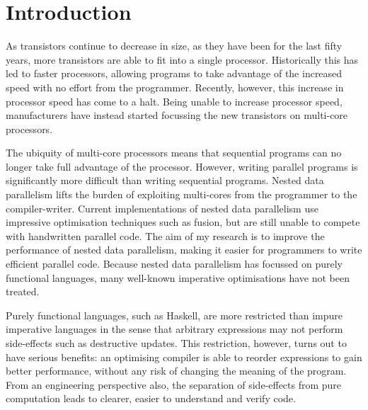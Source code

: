
\section{Introduction}
As transistors continue to decrease in size, as they have been for the last fifty years, more transistors are able to fit into a single processor.
Historically this has led to faster processors, allowing programs to take advantage of the increased speed with no effort from the programmer.
Recently, however, this increase in processor speed has come to a halt.
Being unable to increase processor speed, manufacturers have instead started focussing the new transistors on multi-core processors.

The ubiquity of multi-core processors means that sequential programs can no longer take full advantage of the processor.
However, writing parallel programs is significantly more difficult than writing sequential programs.
Nested data parallelism lifts the burden of exploiting multi-cores from the programmer to the compiler-writer.
Current implementations of nested data parallelism use impressive optimisation techniques such as fusion, but are still unable to compete with handwritten parallel code.
The aim of my research is to improve the performance of nested data parallelism, making it easier for programmers to write efficient parallel code.
Because nested data parallelism has focussed on purely functional languages, many well-known imperative optimisations have not been treated.

Purely functional languages, such as Haskell, are more restricted than impure imperative languages
in the sense that arbitrary expressions may not perform side-effects such as destructive updates.
This restriction, however, turns out to have serious benefits:
an optimising compiler is able to reorder expressions to gain better performance,
without any risk of changing the meaning of the program.
From an engineering perspective also, the separation of side-effects from pure computation leads to clearer, easier to understand and verify code.

